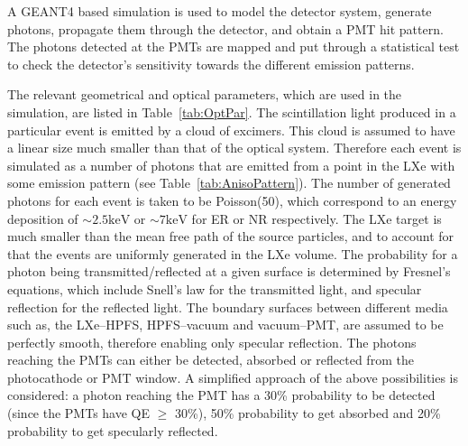  

A GEANT4 based simulation is used to model the detector system, generate photons, propagate them through the detector, and obtain a PMT hit pattern. The photons detected at the 
PMTs are mapped and put through a statistical test to check the detector's sensitivity towards the different emission patterns.

The relevant geometrical and optical parameters, which are used in the simulation, are listed in Table~\ref{tab:OptPar}. 
The scintillation light produced in a particular 
event is emitted by a cloud of excimers. This cloud is assumed to have a linear size much smaller than that 
of the optical system. Therefore each event is simulated as a number of photons that are emitted from a point 
in the LXe with some emission pattern (see Table~\ref{tab:AnisoPattern}). The number of generated photons for each event is taken to be Poisson(50), which correspond to an energy deposition of $\sim2.5\mathrm{keV}$  or $\sim7\mathrm{keV}$ for ER or NR respectively. The LXe target is much smaller than the mean free path of the source particles, and to 
account for that the events are uniformly generated in the LXe volume.
The probability for a photon being transmitted/reflected at a given surface is 
determined by Fresnel's equations, which include Snell's law for the transmitted light, 
and specular reflection for the reflected light. The boundary surfaces between different media
such as, the LXe--HPFS, HPFS--vacuum and vacuum--PMT, are assumed to be perfectly smooth, 
therefore enabling only specular reflection. 
The photons reaching the PMTs can either be detected, absorbed or reflected from the photocathode 
or PMT window. A simplified approach of the above possibilities is considered:
a photon reaching the PMT has a 30\% probability to be detected (since the PMTs have QE $\geq$ 30\%), 
50\% probability to get absorbed and 20\% probability to get specularly reflected. 

